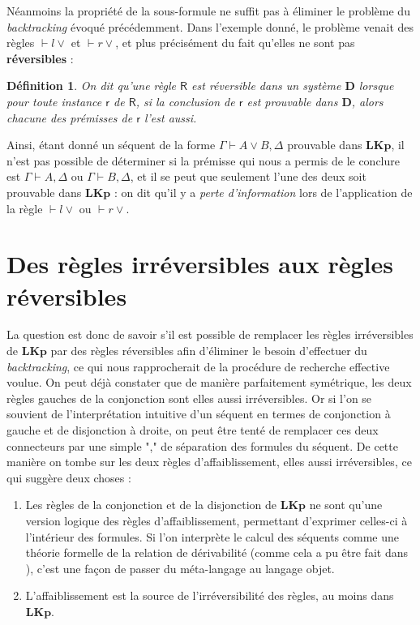 \documentclass[11pt]{report}
\newcommand{\seq}{\vdash}
\newcommand{\irule}[1]{\footnotesize$#1$}
\newcommand{\iruleR}[1]{\irule{\seq{#1}}}
\newtheorem{definition}{Définition}
\begin{document}
Néanmoins la propriété de la sous-formule ne suffit pas à éliminer le problème du \emph{backtracking} évoqué précédemment. Dans l'exemple donné, le problème venait des règles {\iruleR{l\lor}} et {\iruleR{r\lor}}, et plus précisément du fait qu'elles ne sont pas \textbf{réversibles} :

\begin{definition}
    On dit qu'une règle $\mathsf{R}$ est \emph{réversible} dans un système $\mathbf{D}$ lorsque pour toute instance $\mathsf{r}$ de $\mathsf{R}$, si la conclusion de $\mathsf{r}$ est prouvable dans $\mathbf{D}$, alors chacune des prémisses de $\mathsf{r}$ l'est aussi.
\end{definition}

Ainsi, étant donné un séquent de la forme $\Gamma \seq A \lor B,\Delta$ prouvable dans $\mathbf{LKp}$, il n'est pas possible de déterminer si la prémisse qui nous a permis de le conclure est $\Gamma \seq A,\Delta$ ou $\Gamma \seq B,\Delta$, et il se peut que seulement l'une des deux soit prouvable dans $\mathbf{LKp}$ : on dit qu'il y a \emph{perte d'information} lors de l'application de la règle {\iruleR{l\lor}} ou {\iruleR{r\lor}}.


\section{Des règles irréversibles aux règles réversibles}

La question est donc de savoir s'il est possible de remplacer les règles irréversibles de $\mathbf{LKp}$ par des règles réversibles afin d'éliminer le besoin d'effectuer du \emph{backtracking}, ce qui nous rapprocherait de la procédure de recherche effective voulue. On peut déjà constater que de manière parfaitement symétrique, les deux règles gauches de la conjonction sont elles aussi irréversibles. Or si l'on se souvient de l'interprétation intuitive d'un séquent en termes de conjonction à gauche et de disjonction à droite, on peut être tenté de remplacer ces deux connecteurs par une simple "," de séparation des formules du séquent. De cette manière on tombe sur les deux règles d'affaiblissement, elles aussi irréversibles, ce qui suggère deux choses :

\begin{enumerate}
    \item Les règles de la conjonction et de la disjonction de $\mathbf{LKp}$ ne sont qu'une version logique des règles d'affaiblissement, permettant d'exprimer celles-ci à l'intérieur des formules. Si l'on interprète le calcul des séquents comme une théorie formelle de la relation de dérivabilité (comme cela a pu être fait dans \cite{vPN01}), c'est une façon de passer du méta-langage au langage objet.
    \item L'affaiblissement est la source de l'irréversibilité des règles, au moins dans $\mathbf{LKp}$.
\end{enumerate}
\end{document}
